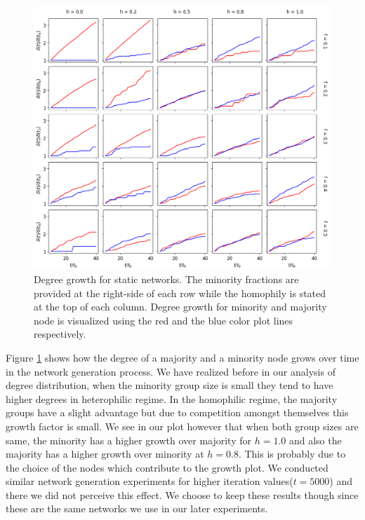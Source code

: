 \begin{figure}[h!]
	\centering
	\includegraphics[width=1.0\textwidth]{images/dg_static.png}
	\caption{Degree growth for static networks. The minority fractions are provided at the right-side of each row while the homophily is stated at the top of each column. Degree growth for minority and majority node is visualized using the red and the blue color plot lines respectively.}
	\label{dg_static_fig}
\end{figure}

Figure \ref{dg_static_fig} shows how the degree of a majority and a minority node grows over time in the network generation process. We have realized before in our analysis of degree distribution, when the minority group size is small they tend to have higher degrees in heterophilic regime. In the homophilic regime, the majority groups have a slight advantage but due to competition amongst themselves this growth factor is small. We see in our plot however that when both group sizes are same, the minority has a higher growth over majority for $h=1.0$ and also the majority has a higher growth over minority at $h=0.8$. This is probably due to the choice of the nodes which contribute to the growth plot. We conducted similar network generation experiments for higher iteration values($t=5000$) and there we did not perceive this effect. We choose to keep these results though since these are the same networks we use in our later experiments. 

